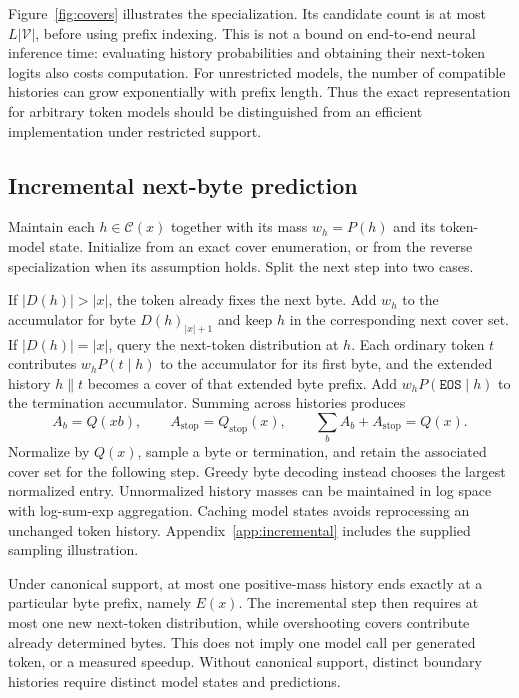 \documentclass{article}
\newcommand{\vocab}{\mathcal{V}}
\newcommand{\covers}{\mathcal{C}}
\newcommand{\eos}{\mathtt{EOS}}
\newcommand{\dec}{D}
\newcommand{\enc}{E}
\begin{document}
Figure~\ref{fig:covers} illustrates the specialization. Its candidate count is at most $L|\vocab|$, before using prefix indexing. This is not a bound on end-to-end neural inference time: evaluating history probabilities and obtaining their next-token logits also costs computation. For unrestricted models, the number of compatible histories can grow exponentially with prefix length. Thus the exact representation for arbitrary token models should be distinguished from an efficient implementation under restricted support.

\subsection{Incremental next-byte prediction}
\label{sec:incremental}
Maintain each $h\in\covers(x)$ together with its mass $w_h=P(h)$ and its token-model state. Initialize from an exact cover enumeration, or from the reverse specialization when its assumption holds. Split the next step into two cases.

If $|\dec(h)|>|x|$, the token already fixes the next byte. Add $w_h$ to the accumulator for byte $\dec(h)_{|x|+1}$ and keep $h$ in the corresponding next cover set. If $|\dec(h)|=|x|$, query the next-token distribution at $h$. Each ordinary token $t$ contributes $w_hP(t\mid h)$ to the accumulator for its first byte, and the extended history $h\mathbin{\|}t$ becomes a cover of that extended byte prefix. Add $w_hP(\eos\mid h)$ to the termination accumulator. Summing across histories produces
\begin{equation}
 A_b=Q(xb),\qquad A_{\mathrm{stop}}=Q_{\mathrm{stop}}(x),\qquad
 \sum_b A_b+A_{\mathrm{stop}}=Q(x).
 \label{eq:accumulators}
\end{equation}
Normalize by $Q(x)$, sample a byte or termination, and retain the associated cover set for the following step. Greedy byte decoding instead chooses the largest normalized entry. Unnormalized history masses can be maintained in log space with log-sum-exp aggregation. Caching model states avoids reprocessing an unchanged token history. Appendix~\ref{app:incremental} includes the supplied sampling illustration.

Under canonical support, at most one positive-mass history ends exactly at a particular byte prefix, namely $\enc(x)$. The incremental step then requires at most one new next-token distribution, while overshooting covers contribute already determined bytes. This does not imply one model call per generated token, or a measured speedup. Without canonical support, distinct boundary histories require distinct model states and predictions.
\end{document}
